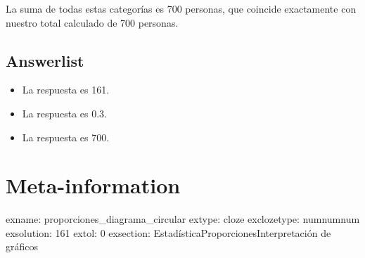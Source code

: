 \documentclass[
]{article}
\providecommand{\tightlist}{%
  \setlength{\itemsep}{0pt}\setlength{\parskip}{0pt}}
\begin{document}
La suma de todas estas categorías es 700 personas, que coincide
exactamente con nuestro total calculado de 700 personas.

\subsection{Answerlist}\label{answerlist-1}

\begin{itemize}
\tightlist
\item
  La respuesta es 161.
\item
  La respuesta es 0.3.
\item
  La respuesta es 700.
\end{itemize}

\section{Meta-information}\label{meta-information}

exname: proporciones\_diagrama\_circular extype: cloze exclozetype:
num\textbar num\textbar num exsolution: 161 extol:
0 exsection:
Estadística\textbar Proporciones\textbar Interpretación de gráficos
\end{document}
